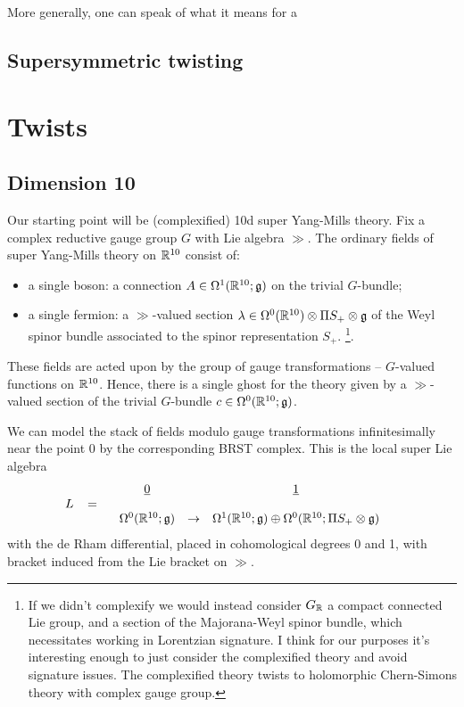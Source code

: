 \documentclass[10pt, oneside]{article}
\begin{document}
\begin{rmk}
More generally, one can speak of what it means for a 
\subsection{Supersymmetric twisting}


\section{Twists}

\subsection{Dimension 10}

Our starting point will be (complexified) 10d super Yang-Mills theory.  
Fix a complex reductive gauge group $G$ with Lie algebra $\gg$.  
The ordinary fields of super Yang-Mills theory on $\mathbb R^{10}$ consist of:
\begin{itemize}
\item a single boson: a connection $A \in \Omega^1(\mathbb R^{10} ; \mathfrak g)$ on the trivial $G$-bundle;
\item a single fermion: a $\gg$-valued section $\lambda \in \Omega^0(\mathbb R^{10}) \otimes \Pi S_+ \otimes \mathfrak g$ of the Weyl spinor bundle associated to the spinor representation $S_+$. 
\footnote{If we didn't complexify we would instead consider $G_\mathbb R$ a compact connected Lie group, and a section of the Majorana-Weyl spinor bundle, which necessitates working in Lorentzian signature.  I think for our purposes it's interesting enough to just consider the complexified theory and avoid signature issues.  The complexified theory twists to holomorphic Chern-Simons theory with complex gauge group.}.  
\end{itemize}
These fields are acted upon by the group of gauge transformations -- $G$-valued functions on $\mathbb R^{10}$. 
Hence, there is a single ghost for the theory given by a $\gg$-valued section of the trivial $G$-bundle $c \in \Omega^0(\mathbb R^{10} ; \mathfrak g)$. 

We can model the stack of fields modulo gauge transformations infinitesimally near the point $0$ by the corresponding BRST complex.  This is the local super Lie algebra
\[
L \;\;\; = \begin{array}{ccccc}
& \underline{0} & & \underline{1} & \\ 
& & & & \\
& \Omega^0(\mathbb R^{10}; \mathfrak{g}) & \to & \Omega^1(\mathbb R^{10}; \mathfrak{g}) \oplus \Omega^0(\mathbb R^{10}; \Pi S_+ \otimes \mathfrak{g}) & 
\end{array}
\]
with the de Rham differential, placed in cohomological degrees 0 and 1, with bracket induced from the Lie bracket on $\gg$.


\end{rmk}
\end{document}
